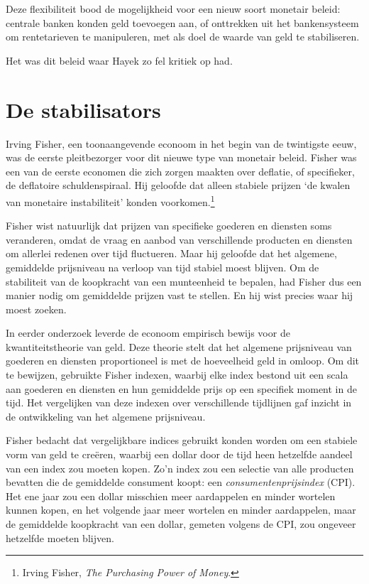 \documentclass[
  a5paper,
  smalldemyvopaper,11pt,twoside,onecolumn,openright,extrafontsizes,
hidelinks]{memoir}
\begin{document}
Deze flexibiliteit bood de mogelijkheid voor een nieuw soort monetair
beleid: centrale banken konden geld toevoegen aan, of onttrekken uit het
bankensysteem om rentetarieven te manipuleren, met als doel de waarde
van geld te stabiliseren.

Het was dit beleid waar Hayek zo fel kritiek op had.

\section{De stabilisators}\label{de-stabilisators}

Irving Fisher, een toonaangevende econoom in het begin van de twintigste
eeuw, was de eerste pleitbezorger voor dit nieuwe type van monetair
beleid. Fisher was een van de eerste economen die zich zorgen maakten
over deflatie, of specifieker, de deflatoire schuldenspiraal. Hij
geloofde dat alleen stabiele prijzen `de kwalen van monetaire
instabiliteit' konden voorkomen.\footnote{\hspace{0pt}Irving Fisher,
  \emph{The Purchasing Power of Money}.}

Fisher wist natuurlijk dat prijzen van specifieke goederen en diensten
soms veranderen, omdat de vraag en aanbod van verschillende producten en
diensten om allerlei redenen over tijd fluctueren. Maar hij geloofde dat
het algemene, gemiddelde prijsniveau na verloop van tijd stabiel moest
blijven. Om de stabiliteit van de koopkracht van een munteenheid te
bepalen, had Fisher dus een manier nodig om gemiddelde prijzen vast te
stellen. En hij wist precies waar hij moest zoeken.

In eerder onderzoek leverde de econoom empirisch bewijs voor de
kwantiteitstheorie van geld. Deze theorie stelt dat het algemene
prijsniveau van goederen en diensten proportioneel is met de hoeveelheid
geld in omloop. Om dit te bewijzen, gebruikte Fisher indexen, waarbij
elke index bestond uit een scala aan goederen en diensten en hun
gemiddelde prijs op een specifiek moment in de tijd. Het vergelijken van
deze indexen over verschillende tijdlijnen gaf inzicht in de
ontwikkeling van het algemene prijsniveau.

Fisher bedacht dat vergelijkbare indices gebruikt konden worden om een
stabiele vorm van geld te creëren, waarbij een dollar door de tijd heen
hetzelfde aandeel van een index zou moeten kopen. Zo'n index zou een
selectie van alle producten bevatten die de gemiddelde consument koopt:
een \emph{consumentenprijsindex} (CPI). Het ene jaar zou een dollar
misschien meer aardappelen en minder wortelen kunnen kopen, en het
volgende jaar meer wortelen en minder aardappelen, maar de gemiddelde
koopkracht van een dollar, gemeten volgens de CPI, zou ongeveer
hetzelfde moeten blijven.
\end{document}
